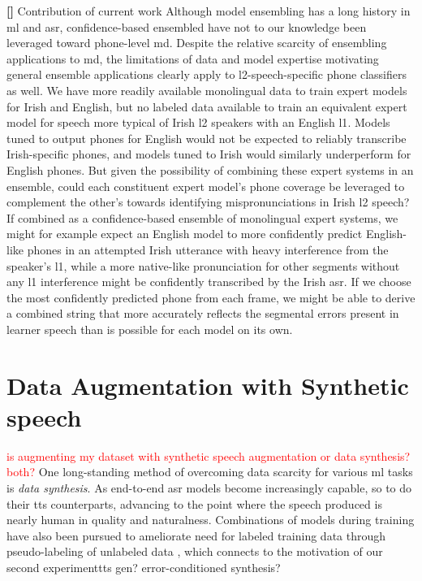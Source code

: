 \documentclass[thesis]{cluu}
\newcounter{paranum}
\newcommand{\numberedparagraph}{\par\refstepcounter{paranum}\textbf{[\theparanum] }}
\newcommand{\todo}[1]{\textcolor{red}{#1}}
\begin{document}
\numberedparagraph{Contribution of current work}
Although model ensembling has a long history in \gls{ml} and \gls{asr}, confidence-based ensembled have not to our knowledge been leveraged toward phone-level \gls{md}. Despite the relative scarcity of ensembling applications to \gls{md}, the limitations of data and model expertise motivating general ensemble applications clearly apply to \gls{l2}-speech-specific phone classifiers as well. We have more readily available monolingual data to train expert models for Irish and English, but no labeled data available to train an equivalent expert model for speech more typical of Irish \gls{l2} speakers with an English \gls{l1}. Models tuned to output phones for English would not be expected to reliably transcribe Irish-specific phones, and models tuned to Irish would similarly underperform for English phones. But given the possibility of combining these expert systems in an ensemble, could each constituent expert model's phone coverage be leveraged to complement the other's towards identifying mispronunciations in Irish \gls{l2} speech? If combined as a confidence-based ensemble of monolingual expert systems, we might for example expect an English model to more confidently predict English-like phones in an attempted Irish utterance with heavy interference from the speaker's \gls{l1}, while a more native-like pronunciation for other segments without any \gls{l1} interference might be confidently transcribed by the Irish \gls{asr}. If we choose the most confidently predicted phone from each frame, we might be able to derive a combined string that more accurately reflects the segmental errors present in learner speech than is possible for each model on its own. 

\section{Data Augmentation with Synthetic speech}
\todo{is augmenting my dataset with synthetic speech augmentation or data synthesis? both?}
One long-standing method of overcoming data scarcity for various \gls{ml} tasks is \textit{data synthesis}. As end-to-end \gls{asr} models become increasingly capable, so to do their \gls{tts} counterparts, advancing to the point where the speech produced is nearly human in quality and naturalness. Combinations of models during training have also been pursued to ameliorate need for labeled training data through pseudo-labeling of unlabeled data \parencite{yangImprovingMispronunciationDetection2022}, which connects to the motivation of our second experimenttts gen? error-conditioned synthesis?
\end{document}
